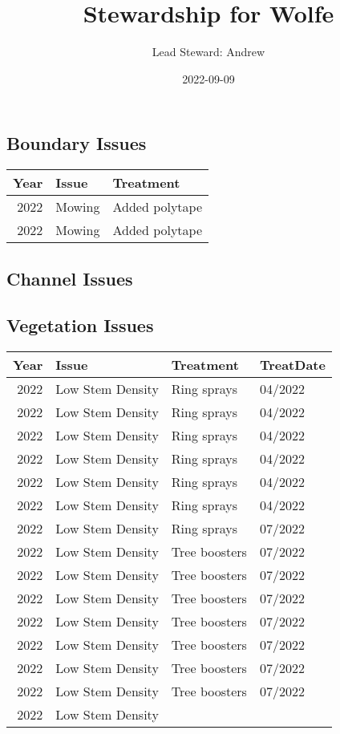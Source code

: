 \documentclass[
  landscape]{article}
\title{Stewardship for Wolfe}
\author{Lead Steward: Andrew}
\date{2022-09-09}
\begin{document}
\maketitle

\hypertarget{boundary-issues}{%
\subsection{Boundary Issues}\label{boundary-issues}}

\begin{longtable}[]{@{}rll@{}}
\toprule()
Year & Issue & Treatment \\
\midrule()
\endhead
2022 & Mowing & Added polytape \\
2022 & Mowing & Added polytape \\
\bottomrule()
\end{longtable}

\hypertarget{channel-issues}{%
\subsection{Channel Issues}\label{channel-issues}}

\textbar\textbar{} \textbar\textbar{} \textbar\textbar{}
\textbar\textbar{}

\newpage

\hypertarget{vegetation-issues}{%
\subsection{Vegetation Issues}\label{vegetation-issues}}

\begin{longtable}[]{@{}rlll@{}}
\toprule()
Year & Issue & Treatment & TreatDate \\
\midrule()
\endhead
2022 & Low Stem Density & Ring sprays & 04/2022 \\
2022 & Low Stem Density & Ring sprays & 04/2022 \\
2022 & Low Stem Density & Ring sprays & 04/2022 \\
2022 & Low Stem Density & Ring sprays & 04/2022 \\
2022 & Low Stem Density & Ring sprays & 04/2022 \\
2022 & Low Stem Density & Ring sprays & 04/2022 \\
2022 & Low Stem Density & Ring sprays & 07/2022 \\
2022 & Low Stem Density & Tree boosters & 07/2022 \\
2022 & Low Stem Density & Tree boosters & 07/2022 \\
2022 & Low Stem Density & Tree boosters & 07/2022 \\
2022 & Low Stem Density & Tree boosters & 07/2022 \\
2022 & Low Stem Density & Tree boosters & 07/2022 \\
2022 & Low Stem Density & Tree boosters & 07/2022 \\
2022 & Low Stem Density & Tree boosters & 07/2022 \\
2022 & Low Stem Density & & \\
\bottomrule()
\end{longtable}
\end{document}
